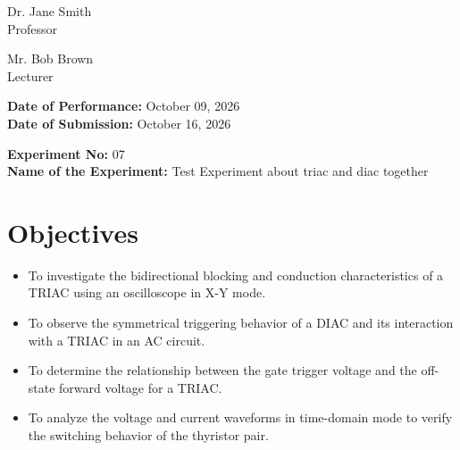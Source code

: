 \documentclass[12pt,a4paper]{article}
\begin{document}
\begin{titlepage}
\begin{minipage}[t]{0.5\textwidth}
\begin{flushright}
            Dr. Jane Smith \\
            Professor \\
            \vspace{0.3cm}
            
            Mr. Bob Brown \\
            Lecturer \\
            
            
        \end{flushright}
    \end{minipage}

    \vfill
    \textbf{Date of Performance:} October 09, 2026 \\
    \textbf{Date of Submission:} October 16, 2026
    
\end{titlepage}

\setcounter{page}{1}
\rmfamily %
\normalsize

\begin{center}
    \textbf{Experiment No:} 07 \\
    \vspace{0.2cm}
    \textbf{Name of the Experiment:} Test Experiment about triac and diac together
\end{center}
\vspace{0.5cm}


\section{Objectives}
\begin{itemize}

    \item To investigate the bidirectional blocking and conduction characteristics of a TRIAC using an oscilloscope in X-Y mode.

    \item To observe the symmetrical triggering behavior of a DIAC and its interaction with a TRIAC in an AC circuit.

    \item To determine the relationship between the gate trigger voltage and the off-state forward voltage for a TRIAC.

    \item To analyze the voltage and current waveforms in time-domain mode to verify the switching behavior of the thyristor pair.

\end{itemize}
\end{document}
